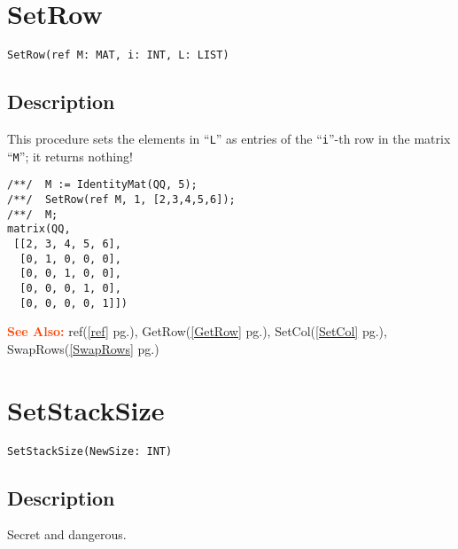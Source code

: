 \documentclass[a4paper]{mybook}
\newenvironment{command}{}{} %
\newcommand\SeeAlso{\par\textcolor{OrangeRed}{\textbf{\large See Also: }}}
\begin{document}
\section{SetRow}
\label{SetRow}
\begin{command} %


\begin{Verbatim}[label=syntax, rulecolor=\color{MidnightBlue},
frame=single]
SetRow(ref M: MAT, i: INT, L: LIST)
\end{Verbatim}


\subsection*{Description}

This procedure sets the elements in ``\verb&L&'' as entries of the
``\verb&i&''-th row in the matrix ``\verb&M&''; it returns nothing!
\begin{Verbatim}[label=example, rulecolor=\color{PineGreen}, frame=single]
/**/  M := IdentityMat(QQ, 5);
/**/  SetRow(ref M, 1, [2,3,4,5,6]);
/**/  M;
matrix(QQ,
 [[2, 3, 4, 5, 6],
  [0, 1, 0, 0, 0],
  [0, 0, 1, 0, 0],
  [0, 0, 0, 1, 0],
  [0, 0, 0, 0, 1]])
\end{Verbatim}


\SeeAlso %
  ref(\ref{ref} pg.\pageref{ref}), 
    GetRow(\ref{GetRow} pg.\pageref{GetRow}), 
    SetCol(\ref{SetCol} pg.\pageref{SetCol}), 
    SwapRows(\ref{SwapRows} pg.\pageref{SwapRows})
\end{command} %

\section{SetStackSize}
\label{SetStackSize}
\begin{command} %


\begin{Verbatim}[label=syntax, rulecolor=\color{MidnightBlue},
frame=single]
SetStackSize(NewSize: INT)
\end{Verbatim}


\subsection*{Description}

Secret and dangerous.

\end{command} %
\end{document}
